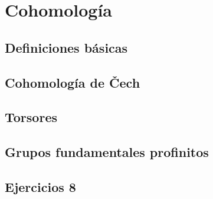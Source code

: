 \chapter{Cohomología}
\label{chap:8}

\section{Definiciones básicas}
\label{sec:8.1}

\section{Cohomología de \v{C}ech}
\label{sec:8.2}

\section{Torsores}
\label{sec:8.3}

\section{Grupos fundamentales profinitos}
\label{sec:8.4}

\section*{Ejercicios 8}
\label{sec:ejercicios-8}
